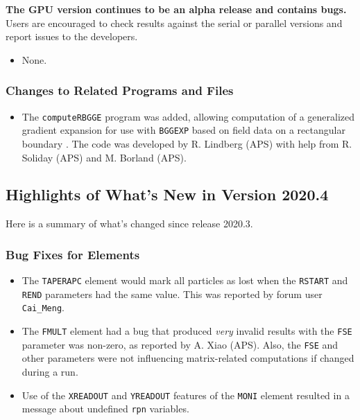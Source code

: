 \documentclass[11pt]{article}
\begin{document}
{\bf The GPU version continues to be an alpha release and contains bugs.}  Users are encouraged to check results against
the serial or parallel versions and report issues to the developers.

\begin{itemize}
\item None.
\end{itemize}

\subsubsection{Changes to Related Programs and Files}

\begin{itemize}
\item The \verb|computeRBGGE| program was added, allowing computation of a generalized gradient expansion\cite{Venturini-NIMA427-387} for
  use with \verb|BGGEXP| based on field data on a rectangular boundary \cite{Mitchell-2007}. The code was developed by R. Lindberg (APS)
  with help from R. Soliday (APS) and M. Borland (APS).
\end{itemize}

\subsection{Highlights of What's New in Version 2020.4}

Here is a summary of what's changed since release 2020.3.

\subsubsection{Bug Fixes for Elements}

\begin{itemize}
\item The \verb|TAPERAPC| element would mark all particles as lost when the \verb|RSTART| and \verb|REND| parameters
  had the same value. This was reported by forum user \verb|Cai_Meng|.
\item The \verb|FMULT| element had a bug that produced {\em very} invalid results with the \verb|FSE| parameter was non-zero,
  as reported by A. Xiao (APS). Also, the \verb|FSE| and other parameters were not influencing matrix-related computations
  if changed during a run.
\item Use of the \verb|XREADOUT| and \verb|YREADOUT| features of the \verb|MONI| element resulted in a message about
  undefined \verb|rpn| variables.
\end{itemize}
\end{document}
